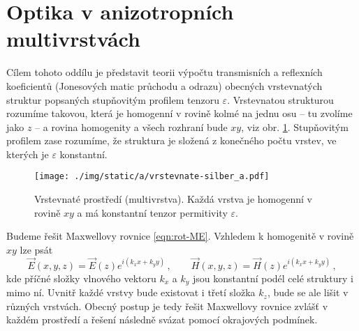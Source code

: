 \section{Optika v anizotropních multivrstvách}
\label{chap:optika-v-multivrstvach}

Cílem tohoto oddílu je představit teorii výpočtu transmisních a reflexních koeficientů (Jonesových matic průchodu a odrazu) obecných vrstevnatých struktur popsaných stupňovitým profilem tenzoru $\varepsilon$.
Vrstevnatou strukturou rozumíme takovou, která je homogenní v rovině kolmé na jednu osu -- tu zvolíme jako $z$ -- a rovina homogenity a všech rozhraní bude $xy$, viz obr. \ref{fig:vrstevnate-prostredi}.
Stupňovitým profilem zase rozumíme, že struktura je složená z konečného počtu vrstev, ve kterých je $\varepsilon$ konstantní.

\begin{figure}[htbp]
    \centering
    \texttt{[image: ./img/static/a/vrstevnate-silber\_a.pdf]}
    \caption{Vrstevnaté prostředí (multivrstva). Každá vrstva je homogenní v rovině $xy$ a má konstantní tenzor permitivity $\varepsilon$. \cite{silberQuadraticMagnetoopticKerr2019a}}
    \label{fig:vrstevnate-prostredi}
\end{figure}

Budeme řešit Maxwellovy rovnice \eqref{eqn:rot-ME}.
Vzhledem k homogenitě v rovině $xy$ lze psát
\begin{equation} 
\label{eqn:pricne-vlnove-vektory}
    \vec{E}(x,y,z)=\vec{E}(z) e^{i(k_xx+k_yy)} \,, \qquad \vec{H}(x,y,z)=\vec{H}(z) e^{i(k_xx+k_yy)} \,,
\end{equation}
kde příčné složky vlnového vektoru $k_x$ a $k_y$ jsou konstantní podél celé struktury i mimo ní.
Uvnitř každé vrstvy bude existovat i třetí složka $k_z$, bude se ale lišit v různých vrstvách.
Obecný postup je tedy řešit Maxwellovy rovnice zvlášť v každém prostředí a řešení následně svázat pomocí okrajových podmínek.
 
